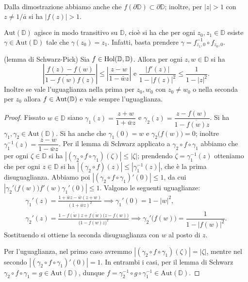 \begin{oss} \label{dom}
  Dalla dimostrazione abbiamo anche che $f(\partial \mathbb{D}) \subset \partial \mathbb{D}$; inoltre, per $|z|>1$ con $z \not=1/\bar{a}$ si ha $|f(z)|>1$.
\end{oss}

\begin{oss} \label{transi}
  $\text{Aut}(\mathbb{D})$ agisce in modo transitivo su $\mathbb{D}$, cioè si ha che per ogni $z_0, z_1 \in \mathbb{D}$ esiste $\gamma \in \text{Aut}(\mathbb{D})$ tale che $\gamma(z_0)=z_1$. Infatti, basta prendere $\gamma=f_{z_1, 0}^{-1} \circ f_{z_0, 0}$.
\end{oss}

\begin{lm} \label{SP}
  (lemma di Schwarz-Pick) Sia $f \in \text{\normalfont{Hol}}(\mathbb{D},\mathbb{D})$.
  Allora per ogni $z, w \in \mathbb{D}$ si ha
  $$\left|\frac{f(z)-f(w)}{1-\overline{f(w)}f(z)}\right| \le \left|\frac{z-w}{1-\bar{w}z}\right| \text{ e } \frac{|f'(z)|}{1-|f(z)|^2} \le \frac{1}{1-|z|^2}.$$
  Inoltre se vale l'uguaglianza nella prima per $z_0, w_0$ con $z_0 \not=w_0$ o nella seconda per $z_0$ allora $f \in \text{\normalfont{Aut}}(\mathbb{D})$ e vale sempre l'uguaglianza.
\end{lm}

\begin{proof}
  Fissato $w \in \mathbb{D}$ siano $\gamma_1(z)=\dfrac{z+w}{1+\bar{w}z}$ e $\gamma_2(z)=\dfrac{z-f(w)}{1-\overline{f(w)}z}$. Si ha $\gamma_1, \gamma_2 \in \text{Aut}(\mathbb{D})$. Si ha anche che $\gamma_1(0)=w$ e $\gamma_2\bigl(f(w)\bigr)=0$; inoltre $\gamma_1^{-1}(z)=\dfrac{z-w}{1-\bar{w}z}$.
  Per il lemma di Schwarz applicato a $\gamma_2 \circ f \circ \gamma_1$ abbiamo che per ogni $\zeta \in \mathbb{D}$ si ha $|(\gamma_2 \circ f \circ \gamma_1)(\zeta)| \le |\zeta|$; prendendo $\zeta=\gamma_1^{-1}(z)$ otteniamo che per ogni $z \in \mathbb{D}$ si ha $|(\gamma_2 \circ f)(z)| \le |\gamma_1^{-1}(z)|$, che è la prima disuguaglianza.
  Abbiamo poi $|(\gamma_2 \circ f \circ \gamma_1)'(0)| \le 1$, da cui $|\gamma_2'\bigl(f(w)\bigr)f'(w)\gamma_1'(0)| \le 1$. Valgono le seguenti uguaglianze:
  \begin{gather*}
    \gamma_1'(z)=\frac{1+\bar{w}z-\bar{w}(z+w)}{(1+\bar{w}z)^2} \implies \gamma_1'(0)=1-|w|^2, \\
    \gamma_2'(z)=\frac{1-\overline{f(w)}z+\overline{f(w)}\bigl(z-f(w)\bigr)}{\bigl(1-\overline{f(w)}z\bigr)^2} \implies \gamma_2'\bigl(f(w)\bigr)=\dfrac{1}{1-|f(w)|^2}.
  \end{gather*}
  Sostituendo si ottiene la seconda disuguaglianza con $w$ al posto di $z$.

  Per l'uguaglianza, nel primo caso avremmo $|(\gamma_2 \circ f \circ \gamma_1)(\zeta)|=|\zeta|$, mentre nel secondo $|(\gamma_2\circ f\circ\gamma_1)'(0)|=1$. In entrambi i casi, per il lemma di Schwarz $\gamma_2 \circ f \circ \gamma_1=g \in \text{Aut}(\mathbb{D})$, dunque $f=\gamma_2^{-1}\circ g \circ \gamma_1^{-1} \in \text{Aut}(\mathbb{D})$.
\end{proof}

